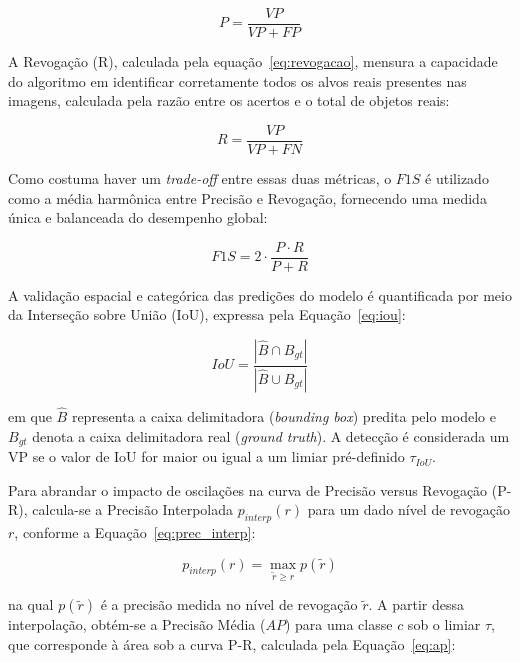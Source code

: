 \begin{equation}
  P = \frac{VP}{VP + FP}
  \label{eq:precisao}
\end{equation}

A Revogação (R), calculada pela equação~\eqref{eq:revogacao}, mensura a capacidade do algoritmo em identificar corretamente todos os alvos reais presentes nas imagens, calculada pela razão entre
os acertos e o total de objetos reais:

\begin{equation}
  R = \frac{VP}{VP + FN}
  \label{eq:revogacao}
\end{equation}

Como costuma haver um \textit{trade-off} entre essas duas métricas, o $F1S$ é utilizado como a média harmônica entre Precisão e Revogação, fornecendo uma medida única e balanceada do desempenho global:

\begin{equation}
  F1S = 2 \cdot \frac{P \cdot R}{P + R}
  \label{eq:f1score}
\end{equation}

A validação espacial e categórica das predições do modelo é quantificada por meio da Interseção sobre União (IoU), expressa pela Equação~\eqref{eq:iou}:

\begin{equation}
  IoU = \frac{|\hat{B} \cap B_{gt}|}{|\hat{B} \cup B_{gt}|}
  \label{eq:iou}
\end{equation}

em que $\hat{B}$ representa a caixa delimitadora (\textit{bounding box}) predita pelo modelo e $B_{gt}$ denota a caixa delimitadora real (\textit{ground truth}). A detecção é considerada um VP se o valor de IoU for maior ou igual a um limiar pré-definido $\tau_{IoU}$.

Para abrandar o impacto de oscilações na curva de Precisão versus Revogação (P-R), calcula-se a Precisão Interpolada $p_{interp}(r)$ para um dado nível de revogação $r$, conforme a Equação~\eqref{eq:prec_interp}:

\begin{equation}
  p_{interp}(r) = \max_{\tilde{r} \geq r} p(\tilde{r})
  \label{eq:prec_interp}
\end{equation}

na qual $p(\tilde{r})$ é a precisão medida no nível de revogação $\tilde{r}$. A partir dessa interpolação, obtém-se a Precisão Média ($AP$) para uma classe $c$ sob o limiar $\tau$, que corresponde à área sob a curva P-R, calculada pela Equação~\eqref{eq:ap}:

